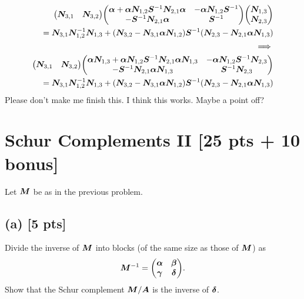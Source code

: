 \documentclass[twoside,10pt]{article}
\begin{document}
\begin{align*}
  \begin{pmatrix}\mtx{N}_{3,1}&\mtx{N}_{3,2}\end{pmatrix}
  \begin{pmatrix}
  \mtx{\alpha} + \mtx{\alpha}\mtx{N}_{1,2}\mtx{S}^{-1}\mtx{N}_{2,1}\mtx{\alpha} & -\mtx{\alpha}\mtx{N}_{1,2}\mtx{S}^{-1}\\
  -\mtx{S}^{-1}\mtx{N}_{2,1}\mtx{\alpha} & \mtx{S}^{-1}
  \end{pmatrix}
  \begin{pmatrix}\mtx{N}_{1,3}\\\mtx{N}_{2,3}\end{pmatrix}\\
  = \mtx{N}_{3,1}\mtx{N}_{1,2}^{-1}\mtx{N}_{1,3} + \left(\mtx{N}_{3,2} - \mtx{N}_{3,1}\mtx{\alpha}\mtx{N}_{1,2}\right)\mtx{S}^{-1}\left(\mtx{N}_{2,3} - \mtx{N}_{2,1}\mtx{\alpha}\mtx{N}_{1,3}\right)\\ 
  \implies\\
  \begin{pmatrix}\mtx{N}_{3,1}&\mtx{N}_{3,2}\end{pmatrix}
  \begin{pmatrix}
  \mtx{\alpha}\mtx{N}_{1,3} + \mtx{\alpha}\mtx{N}_{1,2}\mtx{S}^{-1}\mtx{N}_{2,1}\mtx{\alpha}\mtx{N}_{1,3} & -\mtx{\alpha}\mtx{N}_{1,2}\mtx{S}^{-1}\mtx{N}_{2,3}\\
  -\mtx{S}^{-1}\mtx{N}_{2,1}\mtx{\alpha}\mtx{N}_{1,3} & \mtx{S}^{-1}\mtx{N}_{2,3}
  \end{pmatrix}\\
  = \mtx{N}_{3,1}\mtx{N}_{1,2}^{-1}\mtx{N}_{1,3} + \left(\mtx{N}_{3,2} - \mtx{N}_{3,1}\mtx{\alpha}\mtx{N}_{1,2}\right)\mtx{S}^{-1}\left(\mtx{N}_{2,3} - \mtx{N}_{2,1}\mtx{\alpha}\mtx{N}_{1,3}\right)\\ 
\end{align*}
Please don't make me finish this. I think this works. Maybe a point off?

\section{Schur Complements II [25 pts + 10 bonus]}
Let $\bm{M}$ be as in the previous problem. 

\subsection*{(a) [5 pts]}
Divide the inverse of $\bm{M}$ into blocks (of the same size as those of $\bm{M}$) as
\begin{equation}
  \mtx{M}^{-1} = 
  \begin{pmatrix}
    \mtx{\alpha} & \mtx{\beta} \\
    \mtx{\gamma} & \mtx{\delta}
  \end{pmatrix}.
\end{equation}
Show that the Schur complement $\bm{M} / \bm{A}$ is the inverse of $\bm{\delta}$.
\end{document}
